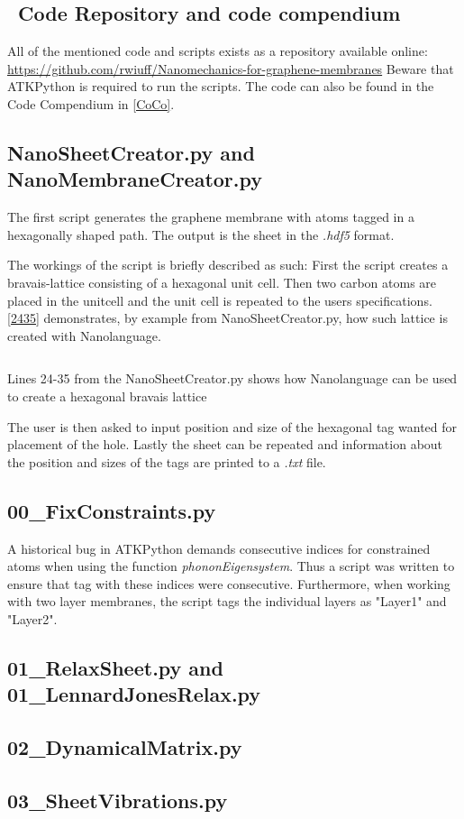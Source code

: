 \subsection{\faGithub \ Code Repository and code compendium}
All of the mentioned code and scripts exists as a repository available online:\newline
\url{https://github.com/rwiuff/Nanomechanics-for-graphene-membranes}
Beware that ATKPython is required to run the scripts.
The code can also be found in the Code Compendium in \cref{CoCo}.

\subsection{NanoSheetCreator.py and NanoMembraneCreator.py}\label{NSCS}
The first script generates the graphene membrane with atoms tagged in a hexagonally shaped path. The output is the sheet in the \textit{.hdf5} format.

The workings of the script is briefly described as such:
First the script creates a bravais-lattice consisting of a hexagonal unit cell. Then two carbon atoms are placed in the unitcell and the unit cell is repeated to the users specifications. \cref{2435} demonstrates, by example from NanoSheetCreator.py, how such lattice is created with Nanolanguage.
\onecolumngrid

\begin{listing}[H]
 \inputminted[python3=true,bgcolor=Black,linenos=true,firstline=24,lastline=35]{python}{Listings/NanoSheetCreator.py}
 \caption{Lines 24-35 from the NanoSheetCreator.py shows how Nanolanguage can be used to create a hexagonal bravais lattice}
 \label{2435}
\end{listing}
\twocolumngrid
The user is then asked to input position and size of the hexagonal tag wanted for placement of the hole. Lastly the sheet can be repeated and information about the position and sizes of the tags are printed to a \textit{.txt} file.

\subsection{00\_FixConstraints.py}\label{00}
A historical bug in ATKPython demands consecutive indices for constrained atoms when using the function \textit{phononEigensystem}. Thus a script was written to ensure that tag with these indices were consecutive. Furthermore, when working with two layer membranes, the script tags the individual layers as "Layer1" and "Layer2".

\subsection{01\_RelaxSheet.py and 01\_LennardJonesRelax.py}\label{01}


\subsection{02\_DynamicalMatrix.py}\label{02}
\subsection{03\_SheetVibrations.py}\label{03}
